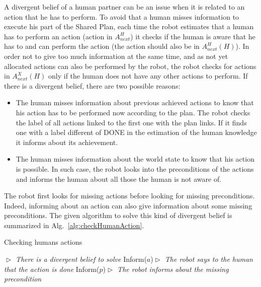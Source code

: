 \documentclass[english,a4paper,11pt,twoside]{StyleThese}
\begin{document}
A divergent belief of a human partner can be an issue when it is related to an action that he has to perform. To avoid that a human misses information to execute his part of the Shared Plan, each time the robot estimates that a human has to perform an action (action in $A^H_{next}$) it checks if the human is aware that he has to and can perform the action (the action should also be in $A^H_{next}(H)$).
In order not to give too much information at the same time, and as not yet allocated actions can also be performed by the robot, the robot checks for actions in $A^X_{next}(H)$ only if the human does not have any other actions to perform. If there is a divergent belief, there are two possible reasons:
\begin{itemize}
\item The human misses information about previous achieved actions to know that his action has to be performed now according to the plan. The robot checks the label of all actions linked to the first one with the plan links. If it finds one with a label different of DONE in the estimation of the human knowledge it informs about its achievement.
\item The human misses information about the world state to know that his action is possible. In such case, the robot looks into the preconditions of the actions and informs the human about all those the human is not aware of.
\end{itemize}
The robot first looks for missing actions before looking for missing preconditions. Indeed, informing about an action can also give information about some missing preconditions.
The given algorithm to solve this kind of divergent belief is summarized in Alg.~\ref{alg:checkHumanAction}.


\begin{algorithm}
\caption{Checking humans actions}
\label{alg:checkHumanAction}
\begin{algorithmic}
\STATE \hfill \textit{$\vartriangleright$ There is a divergent belief to solve}
\STATE Inform($a$)\hfill \textit{$\vartriangleright$ The robot says to the human that the action is done}
\ENDIF
{}
\STATE Inform($p$)\hfill \textit{$\vartriangleright$ The robot informs about the missing precondition}
\ENDIF
\ENDIF
\end{algorithmic}
\end{algorithm} 
\end{document}
